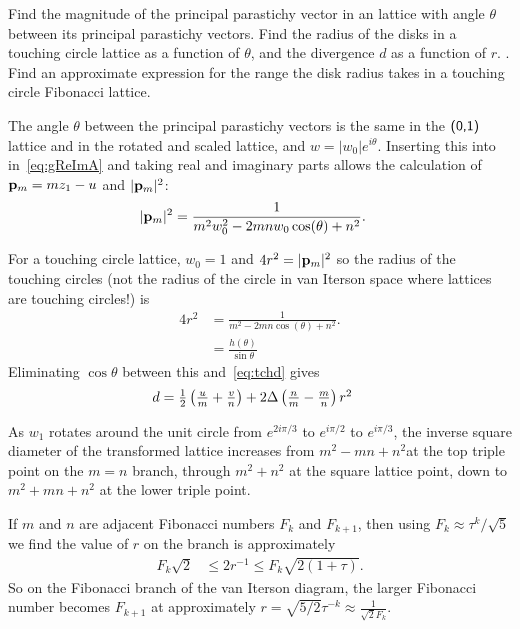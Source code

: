 \begin{jExercise}
	Find the magnitude of the principal parastichy vector in an   lattice with angle $\theta$ between its principal parastichy vectors.
	Find the radius of the disks in a touching circle lattice as a function of $\theta$, and the divergence $d$ as a function of $r$.
	\label{ex:calcprinciplay}. Find an approximate expression for the range the disk radius takes in a touching circle Fibonacci lattice. 
\end{jExercise}
\begin{jAnswer}
The angle  $\theta$ between the principal parastichy vectors is the same in the $\textsf{(0,1)}$ lattice and in the rotated and scaled lattice, and  $w=|w_0|e^{i\theta}$.  Inserting this into in~\eqref{eq:gReImA} and taking real and imaginary parts allows the calculation of ${\mathbf p}_{m}=m z_1 -u$ and $|{\mathbf p}_{m}|^2$: 
	\begin{align}
	|{\mathbf p}_{m}|^2 &=\frac{1}{m^2 w_0^2-2 m n w_0 \cos (\theta )+n^2}.
		\end{align}
	
		
For a touching circle lattice, $w_0=1$ and $4r^2=	|{\mathbf p}_{m}|^2$ so the radius of the touching circles (not the radius of the circle in van Iterson space where lattices are touching circles!) is
\begin{align}
4 r^{2}  &=\frac{1}{ m^2-2 m n \cos (\theta )+n^2}.
\\
&= \frac{h(\theta)}{\sin \theta}
\end{align}
Eliminating $\cos\theta$ between this and~\eqref{eq:tchd} gives
\begin{align}
d&=		\textstyle{\frac{1}{2}}
\left(\frac{u}{m}+\frac{v}{n}\right)
+ 2\Delta  \left(\frac{n}{m}-\frac{m}{n}\right)r^2
\end{align}

As $w_1$ rotates around the unit circle from $e^{2i\pi/3}$ to $e^{i\pi/2}$ to $e^{i\pi/3}$, the inverse square diameter of the transformed lattice increases from $m^2-mn+n^2$at the top triple point on the $m=n$ branch, through  $m^2+n^2$ at the square lattice point, down to $m^2+mn+n^2$  at the lower triple point.



If $m$ and $n$ are adjacent Fibonacci numbers $F_{k}$ and $F_{k+1}$, then using $F_k\approx \tau^k/\sqrt{5}
$ we find the value of $r$ on the branch is approximately
	\begin{align}
  F_k \sqrt{2} &\leq	2 r^{-1}  \leq F_k \sqrt{2(1+\tau)}.
\end{align}
So on the Fibonacci branch of the van Iterson diagram, the larger Fibonacci number becomes $F_{k+1}$ at approximately $r=\sqrt{5/2}\tau^{-k}\approx \frac{1}{\sqrt{2}F_k}$.
\end{jAnswer}





